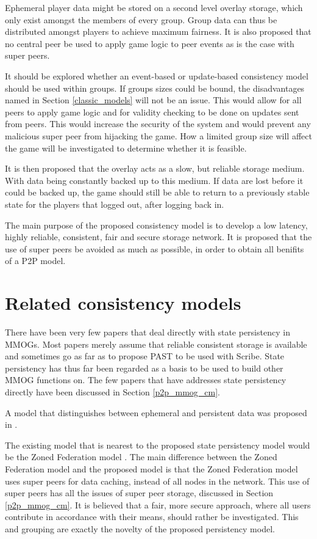 \documentclass[journal,oneside,a4paper,onecolumn]{IEEEtran}
\begin{document}
Ephemeral player data might be stored on a second level overlay storage, which only exist amongst the members of every group. Group data can thus be distributed amongst players to achieve maximum fairness. It is also proposed that no central peer be used to apply game logic to peer events as is the case with super peers.

It should be explored whether an event-based or update-based consistency model should be used within groups. If groups sizes could be bound, the disadvantages named in Section \ref{classic_models} will not be an issue. This would allow for all peers to apply game logic and for validity checking to be done on updates sent from peers. This would increase the security of the system and would prevent any malicious super peer from hijacking the game. How a limited group size will affect the game will be investigated to determine whether it is feasible.

It is then proposed that the overlay acts as a slow, but reliable storage medium. With data being constantly backed up to this medium. If data are lost before it could be backed up, the game should still be able to return to a previously stable state for the players that logged out, after logging back in.

The main purpose of the proposed consistency model is to develop a low latency, highly reliable, consistent, fair and secure storage network. It is proposed that the use of super peers be avoided as much as possible, in order to obtain all benifits of a P2P model.

\section{Related consistency models}
\label{related_cm}

There have been very few papers that deal directly with state persistency in MMOGs. Most papers merely assume that reliable consistent storage is available and sometimes go as far as to propose PAST to be used with Scribe. State persistency has thus far been regarded as a basis to be used to build other MMOG functions on. The few papers that have addresses state persistency directly have been discussed in Section \ref{p2p_mmog_cm}.

A model that distinguishes between ephemeral and persistent data was proposed in \cite{hybrid_storage1}. %

The existing model that is nearest to the proposed state persistency model would be the Zoned Federation model \cite{zoned_federation}. The main difference between the Zoned Federation model and the proposed model is that the Zoned Federation model uses super peers for data caching, instead of all nodes in the network. This use of super peers has all the issues of super peer storage, discussed in Section \ref{p2p_mmog_cm}. It is believed that a fair, more secure approach, where all users contribute in accordance with their means, should rather be investigated. This and grouping are exactly the novelty of the proposed persistency model.
\end{document}
